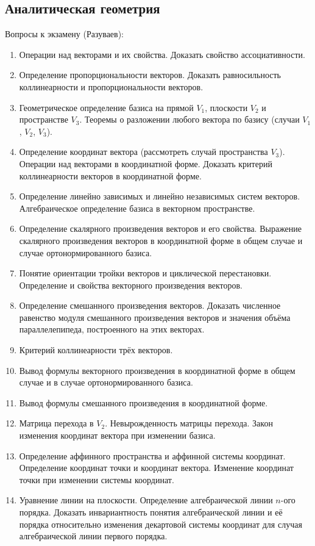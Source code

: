 \documentclass{article}
\begin{document}
\subsection*{Аналитическая геометрия}
Вопросы к экзамену (Разуваев):
\begin{enumerate}
	\item Операции над векторами и их свойства. Доказать свойство ассоциативности.
	\item Определение пропорциональности векторов. Доказать равносильность коллинеарности и пропорциональности векторов.
	\item Геометрическое определение базиса на прямой $V_1$, плоскости $V_2$ и пространстве $V_3$. Теоремы о разложении любого вектора по базису (случаи $V_1$, $V_2$, $V_3$).
	\item Определение координат вектора (рассмотреть случай пространства $V_3$). Операции над векторами в координатной форме. Доказать критерий коллинеарности векторов в координатной форме.
	\item Определение линейно зависимых и линейно независимых систем векторов. Алгебраическое определение базиса в векторном пространстве.
	\item Определение скалярного произведения векторов и его свойства. Выражение скалярного произведения векторов в координатной форме в общем случае и случае ортонормированного базиса.
	\item Понятие ориентации тройки векторов и циклической перестановки. Определение и свойства векторного произведения векторов.
	\item Определение смешанного произведения векторов. Доказать численное равенство модуля смешанного произведения векторов и значения объёма параллелепипеда, построенного на этих векторах.
	\item Критерий коллинеарности трёх векторов.
	\item Вывод формулы векторного произведения в координатной форме в общем случае и в случае ортонормированного базиса.
	\item Вывод формулы смешанного произведения в координатной форме.
	\item Матрица перехода в $V_2$. Невырожденность матрицы перехода. Закон изменения координат вектора при изменении базиса.
	\item Определение аффинного пространства и аффинной системы координат. Определение координат точки и координат вектора. Изменение координат точки при изменении системы координат.
	\item Уравнение линии на плоскости. Определение алгебраической линии $n$-ого порядка. Доказать инвариантность понятия алгебраической линии и её порядка относительно изменения декартовой системы координат для случая алгебраической линии первого порядка.

\end{enumerate}
\end{document}
